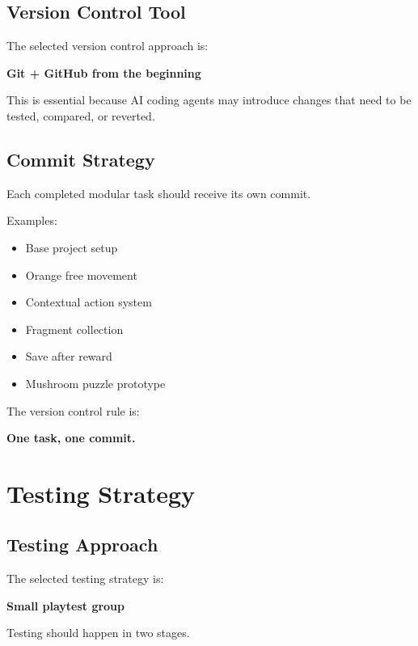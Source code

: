 \documentclass[12pt]{article}
\begin{document}
\subsection{Version Control Tool}

The selected version control approach is:

\begin{center}
\textbf{Git + GitHub from the beginning}
\end{center}

This is essential because AI coding agents may introduce changes that need to be tested, compared, or reverted.

\subsection{Commit Strategy}

Each completed modular task should receive its own commit.

Examples:

\begin{itemize}[leftmargin=*]
    \item Base project setup
    \item Orange free movement
    \item Contextual action system
    \item Fragment collection
    \item Save after reward
    \item Mushroom puzzle prototype
\end{itemize}

The version control rule is:

\begin{center}
\textbf{One task, one commit.}
\end{center}

\section{Testing Strategy}

\subsection{Testing Approach}

The selected testing strategy is:

\begin{center}
\textbf{Small playtest group}
\end{center}

Testing should happen in two stages.
\end{document}
